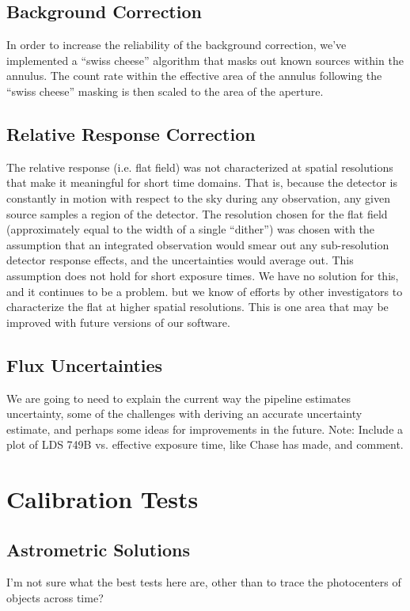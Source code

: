 \documentclass[preprint]{aastex}
\begin{document}
\subsection{Background Correction}
In order to increase the reliability of the background correction, we’ve implemented a ``swiss cheese'' algorithm that masks out known sources within the annulus.  The count rate within the effective area of the annulus following the ``swiss cheese'' masking is then scaled to the area of the aperture.

\subsection{Relative Response Correction}
The relative response (i.e. flat field) was not characterized at spatial resolutions that make it meaningful for short time domains. That is, because the detector is constantly in motion with respect to the sky during any observation, any given source samples a region of the detector. The resolution chosen for the flat field (approximately equal to the width of a single ``dither'') was chosen with the assumption that an integrated observation would smear out any sub-resolution detector response effects, and the uncertainties would average out. This assumption does not hold for short exposure times. We have no solution for this, and it continues to be a problem. but we know of efforts by other investigators to characterize the flat at higher spatial resolutions.  This is one area that may be improved with future versions of our software.

\subsection{Flux Uncertainties}
{\color{red}We are going to need to explain the current way the pipeline estimates uncertainty, some of the challenges with deriving an accurate uncertainty estimate, and perhaps some ideas for improvements in the future.}
{\color{red}Note: Include a plot of LDS 749B vs. effective exposure time, like Chase has made, and comment.}

\section{Calibration Tests}
\label{calibration}

\subsection{Astrometric Solutions}
{\color{red}I'm not sure what the best tests here are, other than to trace the photocenters of objects across time?}
\end{document}
